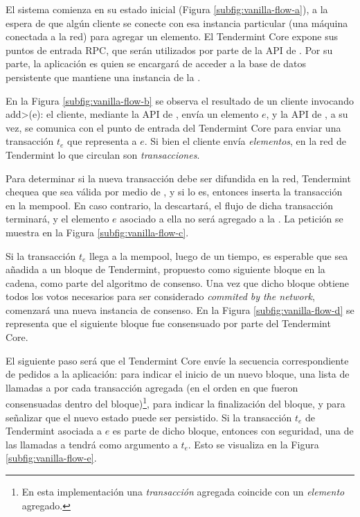 El sistema comienza en su estado inicial (Figura \ref{subfig:vanilla-flow-a}), a la espera de que algún cliente
se conecte con esa instancia particular (una máquina conectada a la red) para agregar un elemento.
El Tendermint Core expone sus puntos de entrada RPC, que serán utilizados por parte de la API de
\setchain. Por su parte, la aplicación es quien se encargará de acceder a la base de datos persistente que
mantiene una instancia de la \setchain.
%

En la Figura \ref{subfig:vanilla-flow-b} se observa el resultado de un cliente invocando \<add>(e): el cliente, mediante
la API de \setchain, envía un elemento $e$, y la API de \setchain, a su vez, se comunica con el
punto de entrada del Tendermint Core para enviar una transacción $t_e$ que representa a $e$.
Si bien el cliente envía \textit{elementos}, en la red de Tendermint
lo que circulan son \textit{transacciones}.
%

Para determinar si la nueva transacción debe ser difundida en la red, Tendermint chequea que
sea válida por medio de \CheckTx, y si lo es, entonces inserta la transacción en la mempool.
En caso contrario, la descartará, el flujo de dicha transacción terminará, y el elemento $e$
asociado a ella no será agregado a la \setchain.
La petición \CheckTx se muestra en la Figura \ref{subfig:vanilla-flow-c}.

%
Si la transacción $t_e$ llega a la mempool, luego de un tiempo, es esperable que sea añadida a un
bloque de Tendermint, propuesto como siguiente bloque en la cadena, como parte del algoritmo de
consenso.
Una vez que dicho bloque obtiene todos los votos necesarios para ser considerado
\textit{commited by the network}, comenzará una nueva instancia de consenso. En la Figura \ref{subfig:vanilla-flow-d}
se representa que el siguiente bloque fue consensuado por parte del Tendermint Core.

%
El siguiente paso será que el Tendermint Core envíe
la secuencia correspondiente de pedidos a la aplicación: \BeginBlock para indicar el inicio de
un nuevo bloque,
una lista de llamadas a \DeliverTx por cada transacción agregada (en el orden en que fueron
consensuadas dentro del bloque)\footnote{En esta implementación
una \textit{transacción} agregada coincide con un \textit{elemento} agregado.},
\EndBlock para indicar la finalización del bloque, y \Commit para señalizar que el nuevo estado
puede ser persistido.
%
Si la transacción $t_e$ de Tendermint asociada a $e$ es parte de dicho bloque,
entonces con seguridad, una de las llamadas a \DeliverTx tendrá como argumento a $t_e$.
Esto se visualiza en la Figura \ref{subfig:vanilla-flow-e}.

